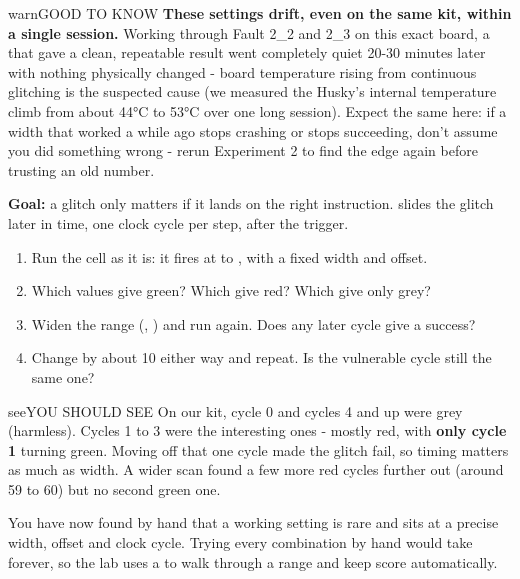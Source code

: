 \documentclass[11pt,letterpaper]{article}
\begin{document}
\begin{guidecallout}{warn}{GOOD TO KNOW}
\textbf{These settings drift, even on the same kit, within a single session.} Working through Fault 2\_2 and 2\_3 on
this exact board, a  that gave a clean, repeatable result went completely
quiet 20-30 minutes later with nothing physically changed - board temperature rising from continuous glitching is the
suspected cause (we measured the Husky's internal temperature climb from about 44°C to 53°C over one long session).
Expect the same here: if a width that worked a while ago stops crashing or stops succeeding, don't assume you did
something wrong - rerun Experiment 2 to find the edge again before trusting an old number.
\end{guidecallout}


\textbf{Goal:} a glitch only matters if it lands on the right instruction.  slides the glitch later
in time, one clock cycle per step, after the trigger.

\begin{enumerate}[label=\arabic*.,leftmargin=1.8em,itemsep=2pt,topsep=2pt,parsep=0pt,start=1]
\item Run the cell as it is: it fires at  to , with a fixed width and offset.
\item Which  values give green? Which give red? Which give only grey?
\item Widen the range (, ) and run again. Does any later cycle give a success?
\item Change  by about 10 either way and repeat. Is the vulnerable cycle still the same one?
\end{enumerate}

\begin{guidecallout}{see}{YOU SHOULD SEE}
On our kit, cycle 0 and cycles 4 and up were grey (harmless). Cycles 1 to 3 were the interesting ones - mostly red,
with \textbf{only cycle 1} turning green. Moving off that one cycle made the glitch fail, so timing matters as much as
width. A wider scan found a few more red cycles further out (around 59 to 60) but no second green one.
\end{guidecallout}


You have now found by hand that a working setting is rare and sits at a precise width, offset and clock cycle. Trying
every combination by hand would take forever, so the lab uses a  to walk through a range and
keep score automatically.
\end{document}
